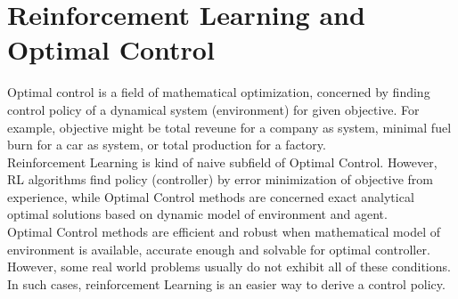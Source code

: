 \section{Reinforcement Learning and Optimal Control}
\label{sec:rl_and_control}
Optimal control is a field of mathematical optimization, concerned by  finding control policy of a dynamical system (environment) for given objective. For example, objective might be total reveune for a company as system, minimal fuel burn for a car as system, or total production for a factory. \\
Reinforcement Learning is kind of naive subfield of Optimal Control. However, RL algorithms find policy (controller) by error minimization of objective from experience, while Optimal Control methods are concerned exact analytical optimal solutions based on dynamic model of environment and agent. \\
Optimal Control methods are efficient and robust when mathematical model of environment is available, accurate enough and solvable for optimal controller. However, some real world problems usually do not exhibit all of these conditions. In such cases, reinforcement Learning is an easier way to derive a control policy.
